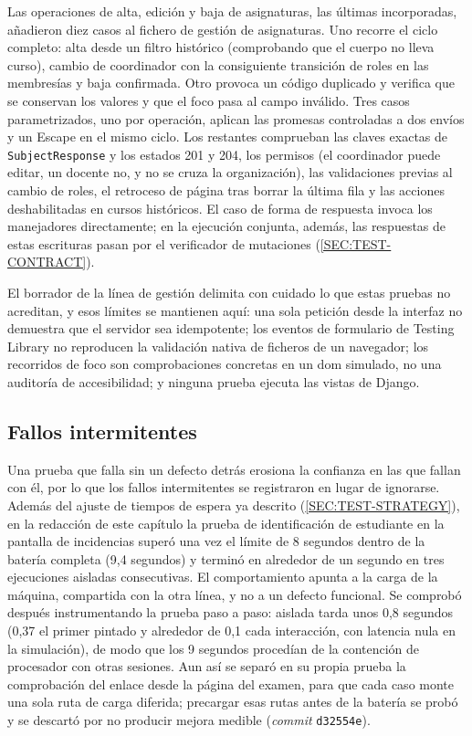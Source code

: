 Las operaciones de alta, edición y baja de asignaturas, las últimas incorporadas, añadieron
diez casos al fichero de gestión de asignaturas. Uno recorre el ciclo completo: alta desde un
filtro histórico (comprobando que el cuerpo no lleva curso), cambio de coordinador con la
consiguiente transición de roles en las membresías y baja confirmada. Otro provoca un código
duplicado y verifica que se conservan los valores y que el foco pasa al campo inválido. Tres
casos parametrizados, uno por operación, aplican las promesas controladas a dos envíos y un
Escape en el mismo ciclo. Los restantes comprueban las claves exactas de
\texttt{SubjectResponse} y los estados 201 y 204, los permisos (el coordinador puede editar,
un docente no, y no se cruza la organización), las validaciones previas al cambio de roles,
el retroceso de página tras borrar la última fila y las acciones deshabilitadas en cursos
históricos. El caso de forma de respuesta invoca los manejadores directamente; en la
ejecución conjunta, además, las respuestas de estas escrituras pasan por el verificador de
mutaciones (\cref{SEC:TEST-CONTRACT}).

El borrador de la línea de gestión delimita con cuidado lo que estas pruebas no acreditan, y
esos límites se mantienen aquí: una sola petición desde la interfaz no demuestra que el
servidor sea idempotente; los eventos de formulario de Testing Library no reproducen la
validación nativa de ficheros de un navegador; los recorridos de foco son comprobaciones
concretas en un \acs{dom} simulado, no una auditoría de accesibilidad; y ninguna prueba
ejecuta las vistas de Django.

\subsection{Fallos intermitentes}

Una prueba que falla sin un defecto detrás erosiona la confianza en las que fallan con él,
por lo que los fallos intermitentes se registraron en lugar de ignorarse. Además del ajuste
de tiempos de espera ya descrito (\cref{SEC:TEST-STRATEGY}), en la redacción de este
capítulo la prueba de identificación de estudiante en la pantalla de incidencias superó una
vez el límite de 8 segundos dentro de la batería completa (9,4 segundos) y terminó en
alrededor de un segundo en tres ejecuciones aisladas consecutivas. El comportamiento apunta
a la carga de la máquina, compartida con la otra línea, y no a un defecto funcional. Se
comprobó después instrumentando la prueba paso a paso: aislada tarda unos 0,8 segundos
(0,37 el primer pintado y alrededor de 0,1 cada interacción, con latencia nula en la
simulación), de modo que los 9 segundos procedían de la contención de procesador con otras
sesiones. Aun así se separó en su propia prueba la comprobación del enlace desde la página
del examen, para que cada caso monte una sola ruta de carga diferida; precargar esas rutas
antes de la batería se probó y se descartó por no producir mejora medible
(\textit{commit} \texttt{d32554e}).

